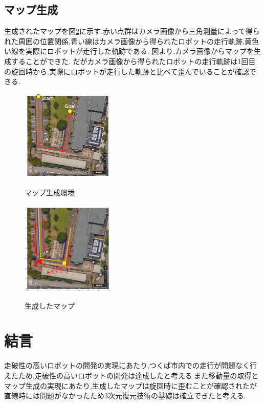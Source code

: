 \documentclass[twocolumn,11pt]{sotsuken_abst}
\begin{document}
\subsection{マップ生成}
生成されたマップを図\ref{fig:mapp}に示す.赤い点群はカメラ画像から三角測量によって得られた周囲の位置関係,青い線はカメラ画像から得られたロボットの走行軌跡,黄色い線を実際にロボットが走行した軌跡である.
図より,カメラ画像からマップを生成することができた.
だがカメラ画像から得られたロボットの走行軌跡は1回目の旋回時から,実際にロボットが走行した軌跡と比べて歪んでいることが確認できる.

\begin{figure}[htp]
 \begin{center}
  \includegraphics[width=45mm]{image/1.png}
 　\caption{マップ生成環境}
  \label{fig:map}%
 \end{center}
\end{figure}


\begin{figure}[htp]
 \begin{center}
  \includegraphics[width=45mm]{image/2.png}
 　\caption{生成したマップ}
  \label{fig:mapp}%
 \end{center}
\end{figure}

\section{結言}
走破性の高いロボットの開発の実現にあたり,つくば市内での走行が問題なく行えたため,走破性の高いロボットの開発は達成したと考える.また移動量の取得とマップ生成の実現にあたり,生成したマップは旋回時に歪むことが確認されたが直線時には問題がなかったため3次元復元技術の基礎は確立できたと考える.
\end{document}

